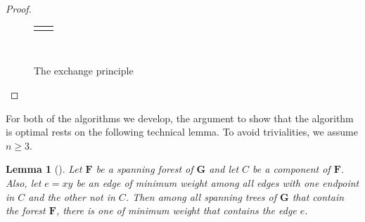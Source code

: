 \documentclass[10pt,]{book}
\theoremstyle{plain}
\newtheorem{lemma}[theorem]{Lemma}
\theoremstyle{definition}
\theoremstyle{definition}
\theoremstyle{definition}
\theoremstyle{definition}
\numberwithin{equation}{section}
\newlength{\panelmax}
\newcommand{\bfG}{\mathbf{G}}
\newcommand{\bfF}{\mathbf{F}}
\begin{document}
\begin{proof}
\begin{figure}
{\begin{lrbox}{\panelboxBimage}
\end{lrbox}
\ifdefined\phBimage\else\newlength{\phBimage}\fi%
\setlength{\phBimage}{\ht\panelboxBimage+\dp\panelboxBimage}
\settototalheight{\phBimage}{\usebox{\panelboxBimage}}
\setlength{\panelmax}{\maxof{\panelmax}{\phBimage}}
\leavevmode%
\setlength{\tabcolsep}{0.01\linewidth}
\par\medskip\noindent
\hspace*{0.01\linewidth}%
\begin{tabular}{@{}*{2}{c}@{}}
\begin{minipage}[c][\panelmax][t]{0.48\linewidth}\usebox{\panelboxAimage}\end{minipage}&
\begin{minipage}[c][\panelmax][t]{0.48\linewidth}\usebox{\panelboxBimage}\end{minipage}\end{tabular}\\
}%
\caption{The exchange principle\label{fig_graphalgorithms_exchange}}
\end{figure}
\end{proof}
\hypertarget{p-172}{}%
For both of the algorithms we develop, the argument to show that the algorithm is optimal rests on the following technical lemma. To avoid trivialities, we assume \(n\ge3\).%
\begin{lemma}[{}]\label{lem_graphalgorithms_tech}
\hypertarget{p-173}{}%
Let \(\bfF\) be a spanning forest of \(\bfG\) and let \(C\) be a component of \(\bfF\). Also, let \(e=xy\) be an edge of minimum weight among all edges with one endpoint in \(C\) and the other not in \(C\). Then among all spanning trees of \(\bfG\) that contain the forest \(\bfF\), there is one of minimum weight that contains the edge \(e\).%
\end{lemma}
\end{document}
